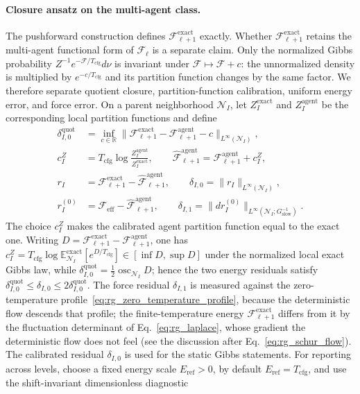 \documentclass[11pt]{article}
\begin{document}
\paragraph{Closure ansatz on the multi-agent class.}
The pushforward construction defines $\mathcal{F}^{\mathrm{exact}}_{\ell+1}$ exactly. Whether $\mathcal{F}^{\mathrm{exact}}_{\ell+1}$ retains the multi-agent functional form of $\mathcal{F}_\ell$ is a separate claim. Only the normalized Gibbs probability $Z^{-1}e^{-\mathcal{F}/T_{\mathrm{cfg}}}d\nu$ is invariant under $\mathcal{F}\mapsto\mathcal{F}+c$: the unnormalized density is multiplied by $e^{-c/T_{\mathrm{cfg}}}$ and its partition function changes by the same factor. We therefore separate quotient closure, partition-function calibration, uniform energy error, and force error. On a parent neighborhood $\mathcal{N}_I$, let $Z_I^{\mathrm{exact}}$ and $Z_I^{\mathrm{agent}}$ be the corresponding local partition functions and define
\begin{align}
\delta_{I,0}^{\mathrm{quot}}
 &= \inf_{c\in\mathbb{R}}\big\|\mathcal{F}^{\mathrm{exact}}_{\ell+1}-\mathcal{F}^{\mathrm{agent}}_{\ell+1}-c\big\|_{L^\infty(\mathcal{N}_I)}, \nonumber\\
c_I^Z
 &= T_{\mathrm{cfg}}\log\frac{Z_I^{\mathrm{agent}}}{Z_I^{\mathrm{exact}}}, \qquad
\widehat{\mathcal{F}}^{\mathrm{agent}}_{\ell+1}=\mathcal{F}^{\mathrm{agent}}_{\ell+1}+c_I^Z, \nonumber\\
r_I
 &= \mathcal{F}^{\mathrm{exact}}_{\ell+1}-\widehat{\mathcal{F}}^{\mathrm{agent}}_{\ell+1}, \qquad
\delta_{I,0}=\|r_I\|_{L^\infty(\mathcal{N}_I)}, \nonumber\\
r_I^{(0)}
 &= \mathcal{F}_{\mathrm{eff}}-\widehat{\mathcal{F}}^{\mathrm{agent}}_{\ell+1}, \qquad
\delta_{I,1}
 = \|dr_I^{(0)}\|_{L^\infty(\mathcal{N}_I;G_{\mathrm{slow}}^{-1})}.
\label{eq:rg_closure}
\end{align}
The choice $c_I^Z$ makes the calibrated agent partition function equal to the exact one. Writing $D=\mathcal{F}^{\mathrm{exact}}_{\ell+1}-\mathcal{F}^{\mathrm{agent}}_{\ell+1}$, one has $c_I^Z=T_{\mathrm{cfg}}\log\mathbb{E}^{\mathrm{exact}}_{\mathcal{N}_I}[e^{D/T_{\mathrm{cfg}}}]\in[\inf D,\sup D]$ under the normalized local exact Gibbs law, while $\delta^{\mathrm{quot}}_{I,0}=\tfrac12\operatorname{osc}_{\mathcal{N}_I}D$; hence the two energy residuals satisfy $\delta^{\mathrm{quot}}_{I,0}\le\delta_{I,0}\le2\delta^{\mathrm{quot}}_{I,0}$. The force residual $\delta_{I,1}$ is measured against the zero-temperature profile~\eqref{eq:rg_zero_temperature_profile}, because the deterministic flow descends that profile; the finite-temperature energy $\mathcal{F}^{\mathrm{exact}}_{\ell+1}$ differs from it by the fluctuation determinant of Eq.~\eqref{eq:rg_laplace}, whose gradient the deterministic flow does not feel (see the discussion after Eq.~\eqref{eq:rg_schur_flow}). The calibrated residual $\delta_{I,0}$ is used for the static Gibbs statements. For reporting across levels, choose a fixed energy scale $E_{\mathrm{ref}}>0$, by default $E_{\mathrm{ref}}=T_{\mathrm{cfg}}$, and use the shift-invariant dimensionless diagnostic
\end{document}
